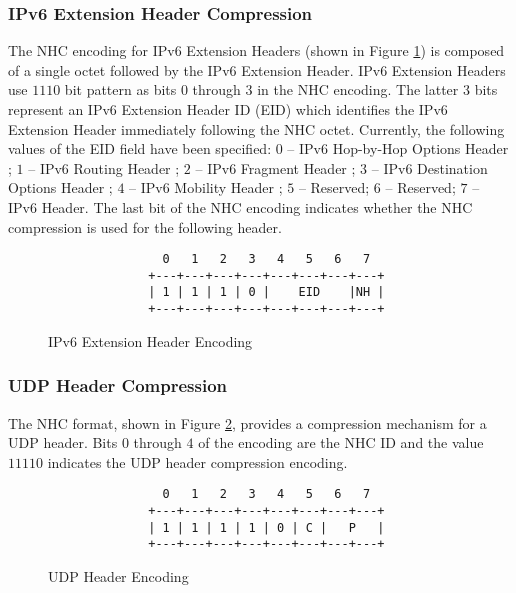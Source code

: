 \documentclass[12pt, titlepage, a4paper]{report}
\newenvironment{mylisting}
{\begin{list}{}{\setlength{\leftmargin}{1em}}\item\footnotesize}
{\end{list}}
\begin{document}
\subsubsection{IPv6 Extension Header Compression}
The NHC encoding for IPv6 Extension Headers (shown in Figure \ref{fig:ipv6.ext.header}) is composed of a single octet followed by the IPv6 Extension Header.  IPv6 Extension Headers use  $1110$ bit pattern as bits $0$ through $3$ in the NHC encoding. The latter 3 bits represent an IPv6 Extension Header ID (EID) which identifies the IPv6 Extension Header immediately following the NHC octet. Currently, the following values of the EID field have been specified:  $0$ -- IPv6 Hop-by-Hop Options Header \cite{rfc2460}; $1$ -- IPv6 Routing Header \cite{rfc2460};  $2$ -- IPv6 Fragment Header \cite{rfc2460}; $3$ -- IPv6 Destination Options Header \cite{rfc2460}; $4$ -- IPv6 Mobility Header \cite{rfc3775}; $5$ -- Reserved; $6$ -- Reserved; $7$ -- IPv6 Header. The last bit of the NHC encoding indicates whether the NHC compression is used for the following header.

\begin{figure}[htp]
\begin{mylisting}
\begin{verbatim}
                0   1   2   3   4   5   6   7
              +---+---+---+---+---+---+---+---+
              | 1 | 1 | 1 | 0 |    EID    |NH |
              +---+---+---+---+---+---+---+---+
\end{verbatim}
\end{mylisting}
\caption{IPv6 Extension Header Encoding}\label{fig:ipv6.ext.header}
\end{figure}

  
\subsubsection{UDP Header Compression}
The NHC format, shown in Figure \ref{fig:udp.header.enc}, provides a compression mechanism for a UDP header.  Bits $0$ through $4$ of the encoding are the NHC ID and the value $11110$ indicates the UDP header compression encoding.

\begin{figure}[htp]
\begin{mylisting}
\begin{verbatim}
                0   1   2   3   4   5   6   7
              +---+---+---+---+---+---+---+---+
              | 1 | 1 | 1 | 1 | 0 | C |   P   |
              +---+---+---+---+---+---+---+---+
\end{verbatim}
\end{mylisting}
\caption{UDP Header Encoding}\label{fig:udp.header.enc}
\end{figure}
\end{document}

